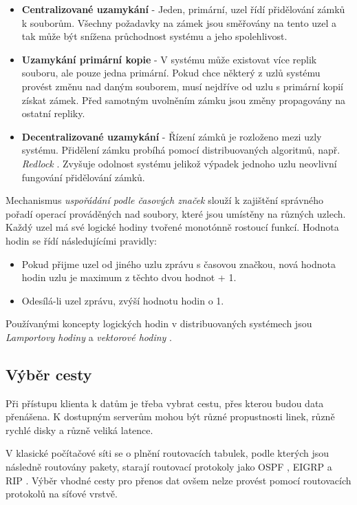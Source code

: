 \documentclass[czech,DP]{thesiskiv}
\begin{document}
\begin{itemize}
\item \textbf{Centralizované uzamykání} - Jeden, primární, uzel řídí přidělování zámků k souborům. Všechny požadavky na zámek jsou směřovány na tento uzel a tak může být snížena průchodnost systému a jeho spolehlivost.
\item \textbf{Uzamykání primární kopie} - V systému může existovat více replik souboru, ale pouze jedna primární. Pokud chce některý z uzlů systému provést změnu nad daným souborem, musí nejdříve od uzlu s primární kopií získat zámek. Před samotným uvolněním zámku jsou změny propagovány na ostatní repliky.
\item \textbf{Decentralizované uzamykání} - Řízení zámků je rozloženo mezi uzly systému. Přidělení zámku probíhá pomocí distribuovaných algoritmů, např. \textit{Redlock} \cite{redlockonline}. Zvyšuje odolnost systému jelikož výpadek jednoho uzlu neovlivní fungování přidělování zámků.
\end{itemize}

Mechanismus \textit{uspořádání podle časových značek} slouží k zajištění správného pořadí operací prováděných nad soubory, které jsou umístěny na různých uzlech. Každý uzel má své logické hodiny tvořené monotónně rostoucí funkcí. Hodnota hodin se řídí následujícími pravidly:

\begin{itemize}
\item Pokud přijme uzel od jiného uzlu zprávu s časovou značkou, nová hodnota hodin uzlu je maximum z těchto dvou hodnot + 1.
\item Odesílá-li uzel zprávu, zvýší hodnotu hodin o 1.
\end{itemize}

\noindent Používanými koncepty logických hodin v distribuovaných systémech jsou \textit{Lamportovy hodiny} \cite{lamportpaper} a \textit{vektorové hodiny} \cite{vectorclockpaper}.

\subsection{Výběr cesty} \label{vybercesty}

Při přístupu klienta k datům je třeba vybrat cestu, přes kterou budou data přenášena. K dostupným serverům mohou být různé propustnosti linek, různě rychlé disky a různě veliká latence. 

V klasické počítačové síti se o plnění routovacích tabulek, podle kterých jsou následně routovány pakety, starají routovací protokoly jako OSPF \cite{ospfpaper}, EIGRP \cite{eigrponline} a RIP \cite{riponline}. Výběr vhodné cesty pro přenos dat ovšem nelze provést pomocí routovacích protokolů na síťové vrstvě. 
\end{document}
